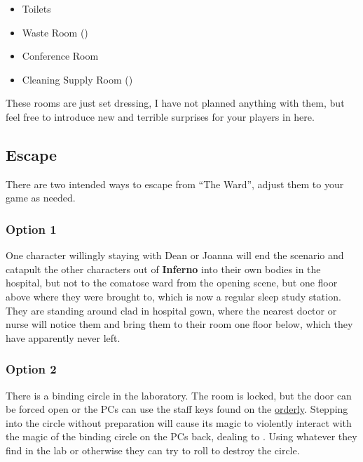 \documentclass[bg-full]{resources/stylesheets/kult}
\begin{document}
\begin{itemize}[noitemsep]
  \item Toilets
  \item Waste Room (\faLock)
  \item Conference Room
  \item Cleaning Supply Room (\faLock)
\end{itemize}

These rooms are just set dressing, I have not planned anything with them, but feel free to introduce new and terrible surprises
for your players in here.

\subsection{Escape}%
\label{sub:escape}

There are two intended ways to escape from “The Ward”, adjust them to your game as needed.

\subsubsection{Option 1}%
\label{ssub:escape_option1}
One character willingly staying with Dean or Joanna will end the scenario and catapult the other characters out of
\textbf{Inferno} into their own bodies in the hospital, but not to the comatose ward from the opening scene, but one floor
above where they were brought to, which is now a regular sleep study station.  They are standing around clad in hospital gown,
where the nearest doctor or nurse will notice them and bring them to their room one floor below, which they have apparently
never left.

\subsubsection{Option 2}%
\label{ssub:escape_option2}
There is a binding circle in the laboratory.  The room is locked, but the door can be forced open or the PCs can use the staff
keys found on the \hyperref[ssub:orderly]{orderly}.  Stepping into the circle without preparation will cause its magic to
violently interact with the magic of the binding circle on the PCs back, dealing  to .  Using whatever they find in the lab or otherwise they can try to roll  to
destroy the circle.
\end{document}
